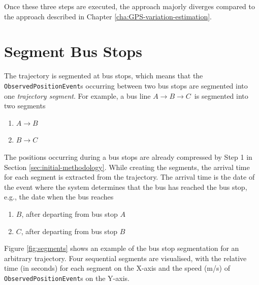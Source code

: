 Once these three steps are executed, the approach majorly diverges compared to the approach described in Chapter \ref{cha:GPS-variation-estimation}.

\section{Segment Bus Stops}
The trajectory is segmented at bus stops, which means that the \texttt{ObservedPositionEvent}s occurring between two bus stops are segmented into one \textit{trajectory segment}.
For example, a bus line $A\rightarrow B\rightarrow C$ is segmented into two segments
\begin{enumerate}
    \item $A\rightarrow B$
    \item $B\rightarrow C$
\end{enumerate}
The positions occurring during a bus stops are already compressed by Step 1 in Section \ref{sec:initial-methodology}.
While creating the segments, the arrival time for each segment is extracted from the trajectory.
The arrival time is the date of the event where the system determines that the bus has reached the bus stop, e.g., the date when the bus reaches 
\begin{enumerate}
    \item $B$, after departing from bus stop $A$
    \item $C$, after departing from bus stop $B$
\end{enumerate}

Figure \ref{fig:segments} shows an example of the bus stop segmentation for an arbitrary trajectory.
Four sequential segments are visualised, with the relative time (in seconds) for each segment on the X-axis and the speed (m/s) of \texttt{ObservedPositionEvent}s on the Y-axis.

